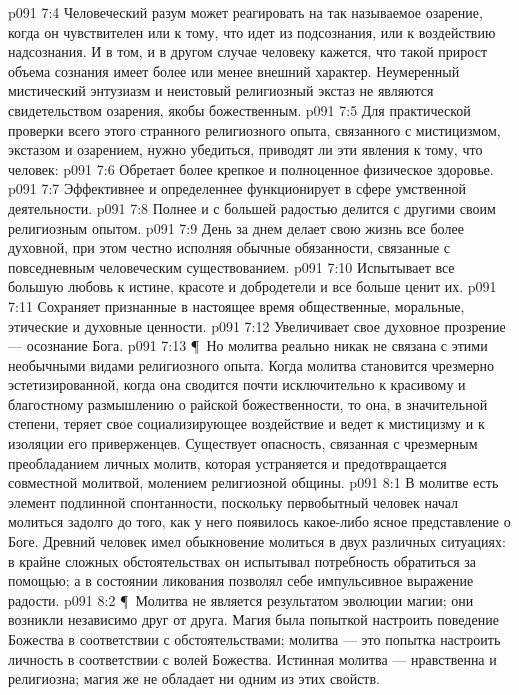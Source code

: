 \vs p091 7:4 Человеческий разум может реагировать на так называемое озарение, когда он чувствителен или к тому, что идет из подсознания, или к воздействию надсознания. И в том, и в другом случае человеку кажется, что такой прирост объема сознания имеет более или менее внешний характер. Неумеренный мистический энтузиазм и неистовый религиозный экстаз не являются свидетельством озарения, якобы божественным.
\vs p091 7:5 Для практической проверки всего этого странного религиозного опыта, связанного с мистицизмом, экстазом и озарением, нужно убедиться, приводят ли эти явления к тому, что человек:
\vs p091 7:6 \bibnobreakspace Обретает более крепкое и полноценное физическое здоровье.
\vs p091 7:7 \bibnobreakspace Эффективнее и определеннее функционирует в сфере умственной деятельности.
\vs p091 7:8 \bibnobreakspace Полнее и с большей радостью делится с другими своим религиозным опытом.
\vs p091 7:9 \bibnobreakspace День за днем делает свою жизнь все более духовной, при этом честно исполняя обычные обязанности, связанные с повседневным человеческим существованием.
\vs p091 7:10 \bibnobreakspace Испытывает все большую любовь к истине, красоте и добродетели и все больше ценит их.
\vs p091 7:11 \bibnobreakspace Сохраняет признанные в настоящее время общественные, моральные, этические и духовные ценности.
\vs p091 7:12 \bibnobreakspace Увеличивает свое духовное прозрение --- осознание Бога.
\vs p091 7:13 \P\ Но молитва реально никак не связана с этими необычными видами религиозного опыта. Когда молитва становится чрезмерно эстетизированной, когда она сводится почти исключительно к красивому и благостному размышлению о райской божественности, то она, в значительной степени, теряет свое социализирующее воздействие и ведет к мистицизму и к изоляции его приверженцев. Существует опасность, связанная с чрезмерным преобладанием личных молитв, которая устраняется и предотвращается совместной молитвой, молением религиозной общины.
\vs p091 8:1 В молитве есть элемент подлинной спонтанности, поскольку первобытный человек начал молиться задолго до того, как у него появилось какое\hyp{}либо ясное представление о Боге. Древний человек имел обыкновение молиться в двух различных ситуациях: в крайне сложных обстоятельствах он испытывал потребность обратиться за помощью; а в состоянии ликования позволял себе импульсивное выражение радости.
\vs p091 8:2 \P\ Молитва не является результатом эволюции магии; они возникли независимо друг от друга. Магия была попыткой настроить поведение Божества в соответствии с обстоятельствами; молитва --- это попытка настроить личность в соответствии с волей Божества. Истинная молитва --- нравственна и религиозна; магия же не обладает ни одним из этих свойств.
